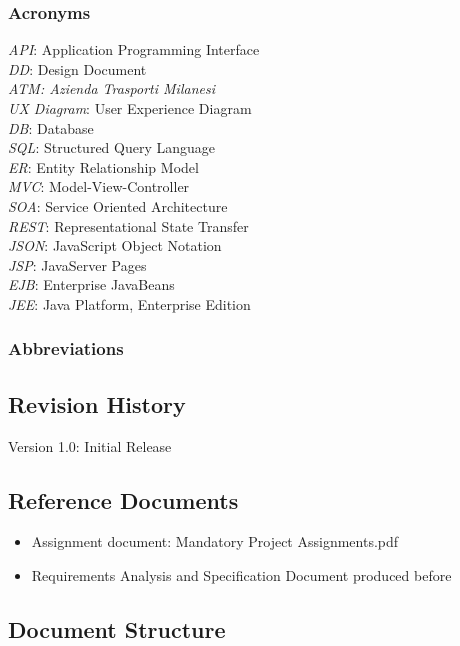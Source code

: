 \documentclass[12pt]{article}
\begin{document}
\subsubsection{Acronyms}
\textit{API}: Application Programming Interface\\
\textit{DD}: Design Document\\
\textit{ATM: Azienda Trasporti Milanesi}\\
\textit{UX Diagram}: User Experience Diagram\\
\textit{DB}: Database\\
\textit{SQL}: Structured Query Language\\
\textit{ER}: Entity Relationship Model\\
\textit{MVC}: Model-View-Controller\\
\textit{SOA}: Service Oriented Architecture\\
\textit{REST}: Representational State Transfer\\
\textit{JSON}: JavaScript Object Notation\\
\textit{JSP}: JavaServer Pages\\
\textit{EJB}: Enterprise JavaBeans\\
\textit{JEE}: Java Platform, Enterprise Edition
\subsubsection{Abbreviations}


\subsection{Revision History}
Version 1.0: Initial Release

\subsection{Reference Documents}
\begin{itemize}
    \item Assignment document: Mandatory Project Assignments.pdf
    \item Requirements Analysis and Specification Document produced before
\end{itemize}


\subsection{Document Structure}
\end{document}

